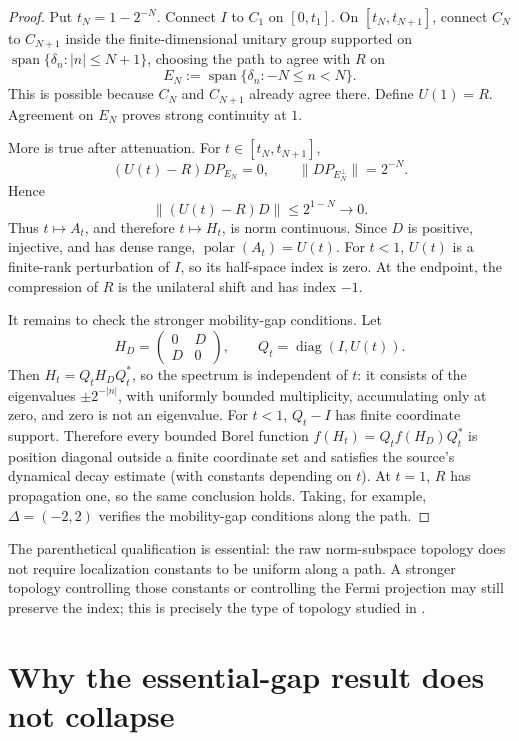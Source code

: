 \documentclass[11pt]{article}
\begin{document}
\begin{proof}
Put \(t_N=1-2^{-N}\).  Connect \(I\) to \(C_1\) on
\([0,t_1]\).  On \([t_N,t_{N+1}]\), connect \(C_N\) to \(C_{N+1}\)
inside the finite-dimensional unitary group supported on
\(\operatorname{span}\{\delta_n:|n|\leq N+1\}\), choosing the path to agree
with \(R\) on
\[
 E_N:=\operatorname{span}\{\delta_n:-N\leq n<N\}.
\]
This is possible because \(C_N\) and \(C_{N+1}\) already agree there.
Define \(U(1)=R\).  Agreement on \(E_N\) proves strong continuity at \(1\).

More is true after attenuation.  For \(t\in[t_N,t_{N+1}]\),
\[
 (U(t)-R)DP_{E_N}=0,\qquad
 \|DP_{E_N^\perp}\|=2^{-N}.
\]
Hence
\[
 \|(U(t)-R)D\|\leq2^{1-N}\longrightarrow0.
\]
Thus \(t\mapsto A_t\), and therefore \(t\mapsto H_t\), is norm continuous.
Since \(D\) is positive, injective, and has dense range,
\(\operatorname{polar}(A_t)=U(t)\).  For \(t<1\), \(U(t)\) is a
finite-rank perturbation of \(I\), so its half-space index is zero.  At the
endpoint, the compression of \(R\) is the unilateral shift and has index
\(-1\).

It remains to check the stronger mobility-gap conditions.  Let
\[
 H_D=\begin{pmatrix}0&D\\D&0\end{pmatrix},
\qquad Q_t=\operatorname{diag}(I,U(t)).
\]
Then \(H_t=Q_tH_DQ_t^*\), so the spectrum is independent of \(t\):
it consists of the eigenvalues \(\pm2^{-|n|}\), with uniformly bounded
multiplicity, accumulating only at zero, and zero is not an eigenvalue.
For \(t<1\), \(Q_t-I\) has finite coordinate support.  Therefore every
bounded Borel function \(f(H_t)=Q_tf(H_D)Q_t^*\) is position diagonal
outside a finite coordinate set and satisfies the source's dynamical decay
estimate (with constants depending on \(t\)).  At \(t=1\), \(R\) has
propagation one, so the same conclusion holds.  Taking, for example,
\(\Delta=(-2,2)\) verifies the mobility-gap conditions along the path.
\end{proof}

The parenthetical qualification is essential: the raw norm-subspace
topology does not require localization constants to be uniform along a
path.  A stronger topology controlling those constants or controlling the
Fermi projection may still preserve the index; this is precisely the type
of topology studied in \cite{Sha}.

\section{Why the essential-gap result does not collapse}
\end{document}
